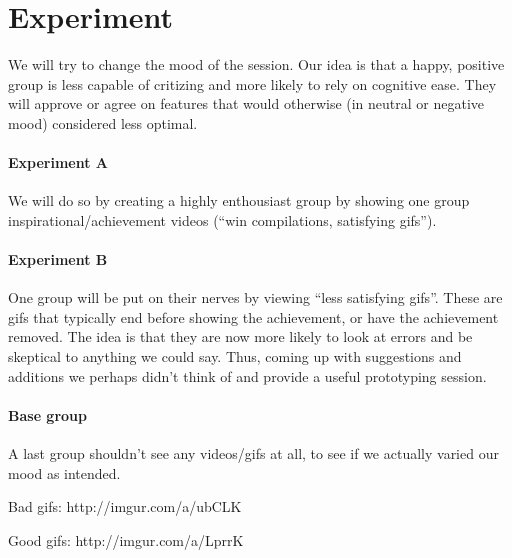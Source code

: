 \section{Experiment}

We will try to change the mood of the session. Our idea is that a happy, positive group is less capable of critizing and more likely to rely on cognitive ease. 
They will approve or agree on features that would otherwise (in neutral or negative mood) considered less optimal. 

\paragraph{Experiment A}
We will do so by creating a highly enthousiast group by showing one group inspirational/achievement videos (``win compilations, satisfying gifs''). 

\paragraph{Experiment B}
One group will be put on their nerves by viewing ``less satisfying gifs''. These are gifs that typically end before showing the achievement, or have the achievement removed. The idea is that they are now more likely to look at errors and be skeptical to anything we could say. Thus, coming up with suggestions and additions we perhaps didn't think of and provide a useful prototyping session. 

\paragraph{Base group}
A last group shouldn't see any videos/gifs at all, to see if we actually varied our mood as intended.


Bad gifs:
http://imgur.com/a/ubCLK

Good gifs:
http://imgur.com/a/LprrK